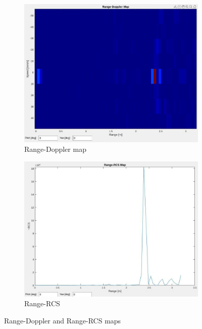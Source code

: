 \begin{figure}[h!]
  \centering
  \begin{subfigure}[b]{0.45\textwidth}
    \centering
    \includegraphics[width=\textwidth]{../img/vis_range_dop.jpg}
    \caption{Range-Doppler map}
  \end{subfigure}
  \hspace{0.05\textwidth}
  \begin{subfigure}[b]{0.45\textwidth}
    \centering
    \includegraphics[width=\textwidth]{../img/vis_range_rcs.jpg}
    \caption{Range-RCS }
  \end{subfigure}
	\caption{Range-Doppler and Range-RCS maps}
  \label{fig:rd_rr_map}
\end{figure}

